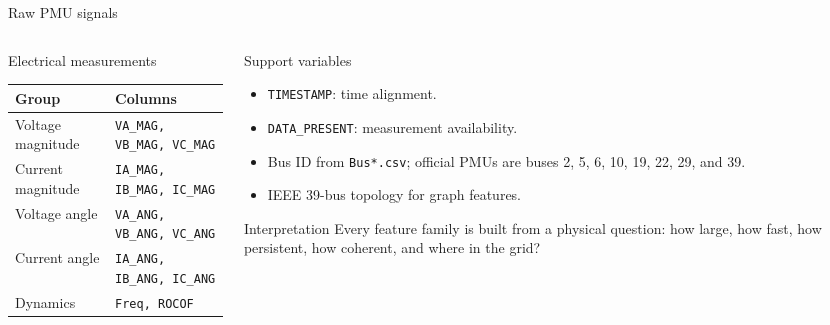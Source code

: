\documentclass[aspectratio=169,10pt,t]{beamer}
\newcommand{\code}[1]{\texttt{\footnotesize #1}}
\begin{document}
\iffalse
\begin{frame}{Raw PMU signals}
\small
\begin{columns}[T,totalwidth=\textwidth]
\begin{column}{0.49\textwidth}
\begin{block}{Electrical measurements}
\begin{tabular}{ll}
\toprule
Group & Columns\\
\midrule
Voltage magnitude & \code{VA\_MAG, VB\_MAG, VC\_MAG}\\
Current magnitude & \code{IA\_MAG, IB\_MAG, IC\_MAG}\\
Voltage angle & \code{VA\_ANG, VB\_ANG, VC\_ANG}\\
Current angle & \code{IA\_ANG, IB\_ANG, IC\_ANG}\\
Dynamics & \code{Freq, ROCOF}\\
\bottomrule
\end{tabular}
\end{block}
\end{column}
\begin{column}{0.47\textwidth}
\begin{block}{Support variables}
\begin{itemize}
  \item \code{TIMESTAMP}: time alignment.
  \item \code{DATA\_PRESENT}: measurement availability.
  \item Bus ID from \code{Bus*.csv}; official PMUs are buses 2, 5, 6, 10, 19, 22, 29, and 39.
  \item IEEE 39-bus topology for graph features.
\end{itemize}
\end{block}
\begin{exampleblock}{Interpretation}
Every feature family is built from a physical question: how large, how fast, how persistent, how coherent, and where in the grid?
\end{exampleblock}
\end{column}
\end{columns}
\end{frame}
\end{document}
